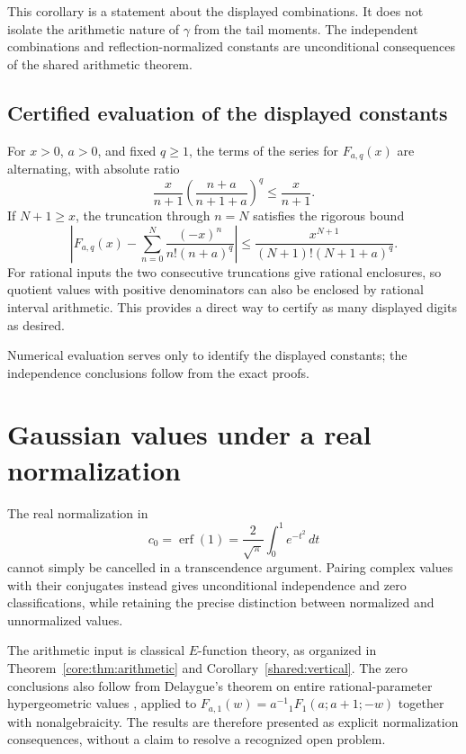 \documentclass[11pt,a4paper]{article}
\DeclareMathOperator{\erf}{erf}
\theoremstyle{definition}
\theoremstyle{remark}
\numberwithin{equation}{section}
\begin{document}
This corollary is a statement about the displayed combinations. It does
not isolate the arithmetic nature of $\gamma$ from the tail moments.
The independent combinations and reflection-normalized constants
are unconditional consequences of the shared arithmetic theorem.

\subsection{Certified evaluation of the displayed constants}

For $x>0$, $a>0$, and fixed $q\geq1$, the terms of the series for
$F_{a,q}(x)$ are alternating, with absolute ratio
\[
 \frac{x}{n+1}\left(\frac{n+a}{n+1+a}\right)^q\leq\frac{x}{n+1}.
\]
If $N+1\geq x$, the truncation through $n=N$ satisfies the rigorous bound
\begin{equation}\label{refl:eq:alternating-error}
 \left|F_{a,q}(x)-\sum_{n=0}^{N}\frac{(-x)^n}{n!(n+a)^q}\right|
 \leq\frac{x^{N+1}}{(N+1)!(N+1+a)^q}.
\end{equation}
For rational inputs the two consecutive truncations give rational
enclosures, so quotient values with positive denominators can also be
enclosed by rational interval arithmetic. This provides a direct way to
certify as many displayed digits as desired.

Numerical evaluation serves only to identify the displayed constants;
the independence conclusions follow from the exact proofs.



\section{Gaussian values under a real normalization}
The real normalization in
\[
 c_0=\erf(1)=\frac{2}{\sqrt\pi}\int_0^1e^{-t^2}\,dt
\]
cannot simply be cancelled in a transcendence argument. Pairing complex
values with their conjugates instead gives unconditional independence
and zero classifications, while retaining the precise distinction
between normalized and unnormalized values.

The arithmetic input is classical $E$-function theory, as organized in
Theorem~\ref{core:thm:arithmetic} and Corollary~\ref{shared:vertical}.
The zero conclusions also follow from Delaygue's theorem on entire
rational-parameter hypergeometric values
\cite[Theorem 1.4]{Delaygue}, applied to
$F_{a,1}(w)=a^{-1}{}_1F_1(a;a+1;-w)$ together with nonalgebraicity.
The results are therefore presented as explicit normalization
consequences, without a claim to resolve a recognized open problem.
\end{document}

